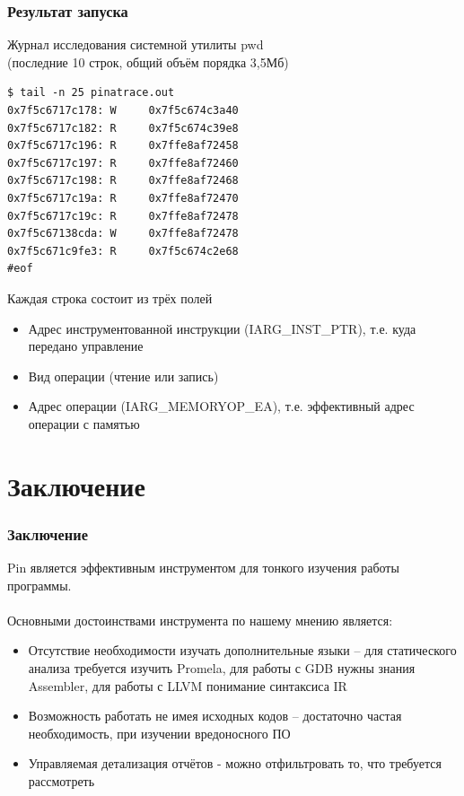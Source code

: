 \documentclass{beamer}
\begin{document}
\begin{frame}[fragile] %
\frametitle{Результат запуска}
\begin{block}{Журнал исследования системной утилиты pwd\\ (последние 10 строк, общий объём порядка 3,5Мб)}
\begin{verbatim}
$ tail -n 25 pinatrace.out 
0x7f5c6717c178: W     0x7f5c674c3a40
0x7f5c6717c182: R     0x7f5c674c39e8
0x7f5c6717c196: R     0x7ffe8af72458
0x7f5c6717c197: R     0x7ffe8af72460
0x7f5c6717c198: R     0x7ffe8af72468
0x7f5c6717c19a: R     0x7ffe8af72470
0x7f5c6717c19c: R     0x7ffe8af72478
0x7f5c67138cda: W     0x7ffe8af72478
0x7f5c671c9fe3: R     0x7f5c674c2e68
#eof
\end{verbatim}
\end{block}

Каждая строка состоит из трёх полей
\begin{itemize}
\item Адрес инструментованной инструкции (IARG\_INST\_PTR), т.е. куда передано управление
\item Вид операции (чтение или запись)
\item Адрес операции (IARG\_MEMORYOP\_EA), т.е. эффективный адрес операции с памятью
\end{itemize}

\end{frame}

\section{Заключение}

\begin{frame}
\frametitle{Заключение}
Pin является эффективным инструментом для тонкого изучения работы программы.\\~\\

Основными достоинствами инструмента по нашему мнению является:
\begin{itemize}
\item Отсутствие необходимости изучать дополнительные языки -- для статического анализа требуется изучить Promela, для работы с GDB нужны знания Assembler, для работы с LLVM понимание синтаксиса IR
\item Возможность работать не имея исходных кодов -- достаточно частая необходимость, при изучении вредоносного ПО
\item Управляемая детализация отчётов - можно отфильтровать то, что требуется рассмотреть
\end{itemize}
\end{frame}
\end{document}
